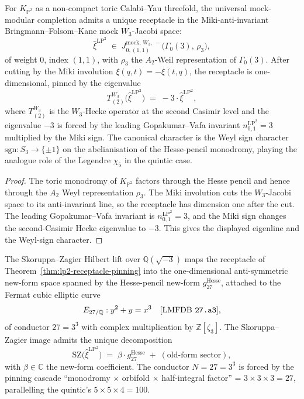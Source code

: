 \begin{theorem}
\label{thm:lp2-receptacle-pinning}
For $K_{\mathbb{P}^2}$ as a non-compact toric Calabi--Yau threefold,
the universal mock-modular completion admits a unique receptacle in
the Miki-anti-invariant Bringmann--Folsom--Kane mock $W_3$-Jacobi
space:
\[
 \widehat{\xi}^{\mathrm{LP^2}}
 \;\in\;
 J^{\mathrm{mock},\, W_3,\, -}_{0, (1, 1)}\bigl(\Gamma_0(3),\, \rho_3\bigr),
\]
of weight $0$, index $(1, 1)$, with $\rho_3$ the $A_2$-Weil
representation of $\Gamma_0(3)$. After cutting by the Miki involution
$\xi(q, t) = -\xi(t, q)$, the receptacle is one-dimensional, pinned by
the eigenvalue
\[
 T^{W_3}_{(2)}\bigl(\widehat{\xi}^{\mathrm{LP^2}}\bigr)
 \;=\; -3 \cdot \widehat{\xi}^{\mathrm{LP^2}},
\]
where $T^{W_3}_{(2)}$ is the $W_3$-Hecke operator at the second
Casimir level and the eigenvalue $-3$ is forced by the leading
Gopakumar--Vafa invariant $n_{0, 1}^{\mathrm{LP^2}} = 3$ multiplied by
the Miki sign. The canonical character is the Weyl sign
character $\mathrm{sgn}: S_3 \to \{\pm 1\}$ on the abelianisation of
the Hesse-pencil monodromy, playing the analogue role of the Legendre
$\chi_5$ in the quintic case.
\end{theorem}

\begin{proof}
The toric monodromy of $K_{\mathbb{P}^2}$ factors through the Hesse
pencil and hence through the $A_2$ Weyl representation $\rho_3$. The
Miki involution cuts the $W_3$-Jacobi space to its anti-invariant line,
so the receptacle has dimension one after the cut. The leading
Gopakumar--Vafa invariant is $n^{\mathrm{LP}^2}_{0,1}=3$, and the Miki
sign changes the second-Casimir Hecke eigenvalue to $-3$. This gives
the displayed eigenline and the Weyl-sign character.
\end{proof}

\begin{theorem}
\label{thm:lp2-E27-pinning}
The Skoruppa--Zagier Hilbert lift over $\mathbb{Q}(\sqrt{-3})$ maps
the receptacle of Theorem~\ref{thm:lp2-receptacle-pinning} into the
one-dimensional anti-symmetric new-form space spanned by the
Hesse-pencil new-form $g^{\mathrm{Hesse}}_{27}$, attached to the
Fermat cubic elliptic curve
\[
 E_{27/\mathbb{Q}}: y^2 + y = x^3 \quad
 \textup{[}\text{LMFDB } \texttt{27.a3}\textup{],}
\]
of conductor $27 = 3^3$ with complex multiplication by
$\mathbb{Z}[\zeta_3]$. The Skoruppa--Zagier image admits the unique
decomposition
\[
 \mathrm{SZ}\bigl(\widehat{\xi}^{\mathrm{LP^2}}\bigr)
 \;=\; \beta \cdot g^{\mathrm{Hesse}}_{27}
 \;+\; (\text{old-form sector}),
\]
with $\beta \in \mathbb{C}$ the new-form coefficient. The conductor
$N = 27 = 3^3$ is forced by the pinning cascade
``\textup{monodromy} $\times$ \textup{orbifold} $\times$ \textup{half-integral factor}'' = $3 \times 3 \times 3 = 27$,
parallelling the quintic's $5 \times 5 \times 4 = 100$.
\end{theorem}

